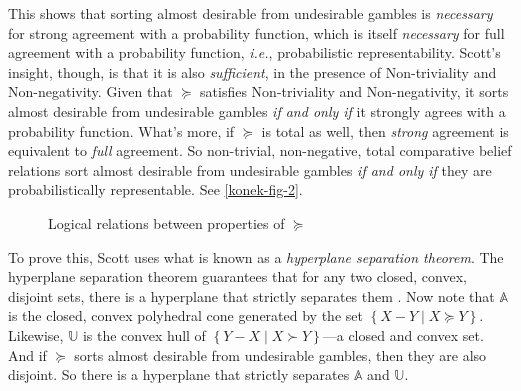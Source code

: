 This shows that sorting almost desirable from undesirable gambles is \textit{necessary} for strong agreement with a probability function, which is itself \textit{necessary} for full agreement with a probability function, \textit{i.e.}, probabilistic representability. Scott's insight, though, is that it is also \textit{sufficient}, in the presence of Non-triviality and Non-negativity. Given that $\succeq$ satisfies Non-triviality and Non-negativity, it sorts almost desirable from undesirable gambles \textit{if and only if} it strongly agrees with a probability function. What's more, if $\succeq$ is total as well, then \textit{strong} agreement is equivalent to \textit{full} agreement. So non-trivial, non-negative, total comparative belief relations sort almost desirable from undesirable gambles \textit{if and only if} they are probabilistically representable. See \autoref{konek-fig-2}.

\begin{figure}
\centering
{}
\caption{Logical relations between properties of $\succeq$}\label{konek-fig-2}
\end{figure}

To prove this, Scott uses what is known as a \textit{hyperplane separation theorem}. The hyperplane separation theorem guarantees that for any two closed, convex, disjoint sets, there is a hyperplane that strictly separates them \citep[p. 50]{Kuhn1956}. Now note that $\mathbb{A}$ is the closed, convex polyhedral cone generated by the set $\left\{X-Y \mathrel{|} X\succeq Y\right\}$. Likewise, $\mathbb{U}$ is the convex hull of $\left\{Y-X \mathrel{|} X\succ Y\right\}$---a closed and convex set. And if $\succeq$ sorts almost desirable from undesirable gambles, then they are also disjoint. So there is a hyperplane that strictly separates $\mathbb{A}$ and $\mathbb{U}$.

